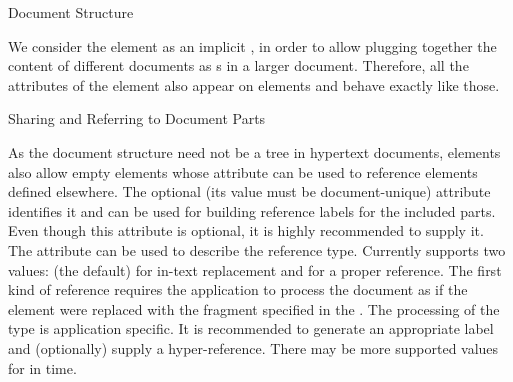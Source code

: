 \begin{omgroup}[id=omdoc-infrastructure,short=Document Infrastructure]
\begin{omgroup}[id=sectioning]{Document Structure}
\begin{module}[id=sectioning]
We consider the {} element as an implicit {}, in order to
allow plugging together the content of different {\omdoc} documents as
{s} in a larger document. Therefore, all the attributes of the
{} element also appear on {} elements and behave exactly
like those.
\end{module}
\end{omgroup}

\begin{module}[id=sharing]
\begin{omgroup}[id=sharing,short=Sharing Document Parts] 
{Sharing and Referring to Document Parts}

\begin{definition}[id=ref.def]
  As the document structure need not be a tree in hypertext documents, {}
  elements also allow empty {} elements whose {} attribute
  can be used to reference {\omdoc} elements defined elsewhere. The optional
  {} (its value must be document-unique) attribute
  identifies it and can be used for building reference labels for the included parts. Even
  though this attribute is optional, it is highly recommended to supply it.  The
  {} attribute can be used to describe the reference type.  Currently
  {\omdoc} supports two values: {} (the default) for in-text
  replacement and {} for a proper reference. The first kind of
  reference requires the {\omdoc} application to process the document as if the
  {} element were replaced with the {\omdoc} fragment specified in the
  {}. The processing of the type {} is
  application specific. It is recommended to generate an appropriate label and
  (optionally) supply a hyper-reference.  There may be more supported values for
  {} in time.
\end{definition}


\end{omgroup}
\end{module}
\end{omgroup}
